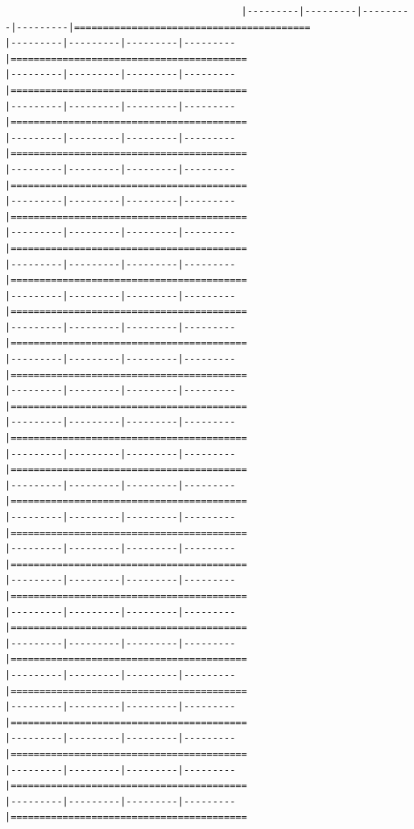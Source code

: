 \documentclass[
]{article}
\begin{document}
\begin{verbatim}
                                         |---------|---------|---------|---------|=========================================                                          |---------|---------|---------|---------|=========================================                                          |---------|---------|---------|---------|=========================================                                          |---------|---------|---------|---------|=========================================                                          |---------|---------|---------|---------|=========================================                                          |---------|---------|---------|---------|=========================================                                          |---------|---------|---------|---------|=========================================                                          |---------|---------|---------|---------|=========================================                                          |---------|---------|---------|---------|=========================================                                          |---------|---------|---------|---------|=========================================                                          |---------|---------|---------|---------|=========================================                                          |---------|---------|---------|---------|=========================================                                          |---------|---------|---------|---------|=========================================                                          |---------|---------|---------|---------|=========================================                                          |---------|---------|---------|---------|=========================================                                          |---------|---------|---------|---------|=========================================                                          |---------|---------|---------|---------|=========================================                                          |---------|---------|---------|---------|=========================================                                          |---------|---------|---------|---------|=========================================                                          |---------|---------|---------|---------|=========================================                                          |---------|---------|---------|---------|=========================================                                          |---------|---------|---------|---------|=========================================                                          |---------|---------|---------|---------|=========================================                                          |---------|---------|---------|---------|=========================================                                          |---------|---------|---------|---------|=========================================                                          |---------|---------|---------|---------|=========================================                                          
\end{verbatim}
\end{document}
